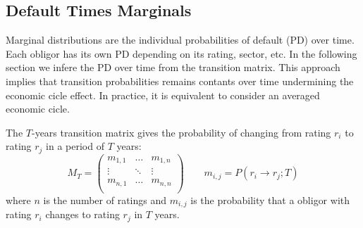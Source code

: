 \documentclass[11pt,fleqn]{book} %
\begin{document}
\subsection{Default Times Marginals}

Marginal distributions are the individual probabilities of default 
(PD) over time. Each obligor has its own PD depending on its rating,
sector, etc. In the following section we infere the PD over time from 
the transition matrix. This approach implies that transition 
probabilities remains contants over time undermining the economic 
cicle effect. In practice, it is equivalent to consider an averaged 
economic cicle.

\begin{definition} 
The $T$-years transition matrix gives the probability of changing 
from rating $r_i$ to rating $r_j$ in a period of $T$ years:
\begin{displaymath}
M_T = \left(
\begin{array}{ccc}
m_{1,1} & \dots  & m_{1,n} \\
\vdots & \ddots & \vdots   \\
m_{n,1} & \dots  & m_{n,n} \\
\end{array}
\right)
\qquad
m_{i,j} = P(r_i \to r_j;T)
\end{displaymath}
where $n$ is the number of ratings and $m_{i,j}$ is the probability that a
obligor with rating $r_i$ changes to rating $r_j$ in $T$ years.
\end{definition}
\end{document}
